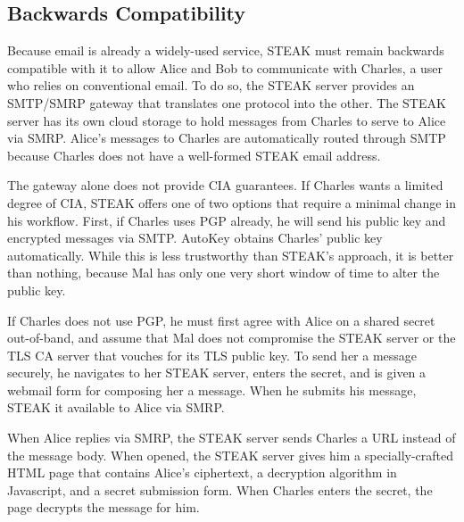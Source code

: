 \subsection{Backwards Compatibility}
Because email is already a widely-used service, STEAK must remain backwards compatible with it to allow Alice and Bob to communicate with Charles, a user who relies on conventional email.  To do so, the STEAK server provides an SMTP/SMRP gateway that translates one protocol into the other.  The STEAK server has its own cloud storage to hold messages from Charles to serve to Alice via SMRP.  Alice's messages to Charles are automatically routed through SMTP because Charles does not have a well-formed STEAK email address.

The gateway alone does not provide CIA guarantees.  If Charles wants a limited degree of CIA, STEAK offers one of two options that require a minimal change in his workflow.  First, if Charles uses PGP already, he will send his public key and encrypted messages via SMTP.  AutoKey obtains Charles' public key automatically.  While this is less trustworthy than STEAK's approach, it is better than nothing, because Mal has only one very short window of time to alter the public key.

If Charles does not use PGP, he must first agree with Alice on a shared secret out-of-band, and assume that Mal does not compromise the STEAK server or the TLS CA server that vouches for its TLS public key.  To send her a message securely, he navigates to her STEAK server, enters the secret, and is given a webmail form for composing her a message.  When he submits his message, STEAK it available to Alice via SMRP.

When Alice replies via SMRP, the STEAK server sends Charles a URL instead of the message body.  When opened, the STEAK server gives him a specially-crafted HTML page that contains Alice's ciphertext, a decryption algorithm in Javascript, and a secret submission form.  When Charles enters the secret, the page decrypts the message for him.
